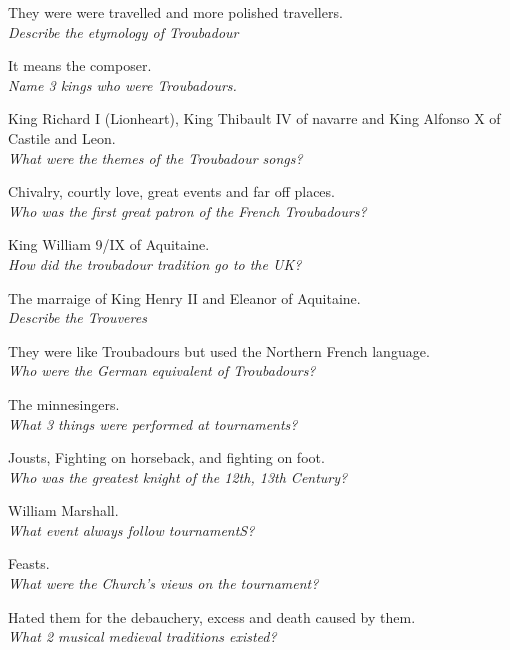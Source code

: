 \documentclass[12pt]{article}
\begin{document}
They were were travelled and more polished travellers.\\

\textit{Describe the etymology of Troubadour}

It means the composer.\\

\textit{Name 3 kings who were Troubadours.}

King Richard I (Lionheart), King Thibault IV of navarre and King Alfonso X of Castile and Leon.\\

\textit{What were the themes of the Troubadour songs?}

Chivalry, courtly love, great events and far off places.\\

\textit{Who was the first great patron of the French Troubadours?}

King William 9/IX of Aquitaine.\\

\textit{How did the troubadour tradition go to the UK?}

The marraige of King Henry II and Eleanor of Aquitaine.\\

\textit{Describe the Trouveres}

They were like Troubadours but used the Northern French language.\\

\textit{Who were the German equivalent of Troubadours?}

The minnesingers.\\

\textit{What 3 things were performed at tournaments?}

Jousts, Fighting on horseback, and fighting on foot.\\

\textit{Who was the greatest knight of the 12th, 13th Century?}

William Marshall.\\

\textit{What event always follow tournamentS?}

Feasts.\\

\textit{What were the Church's views on the tournament?}

Hated them for the debauchery, excess and death caused by them.\\

\textit{What 2 musical medieval traditions existed?}
\end{document}
